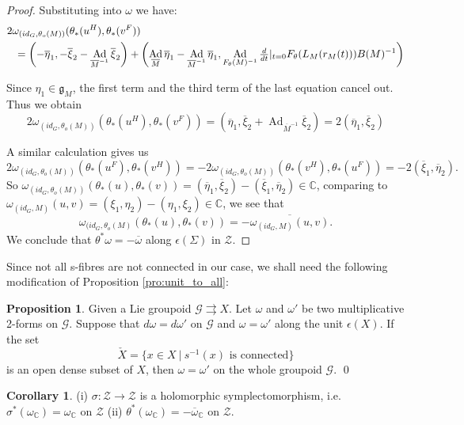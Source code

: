 \documentclass[a4paper,12pt,leqno]{amsart}
\numberwithin{equation}{section}
\theoremstyle{plain}
\theoremstyle{definition}
\DeclareMathOperator{\Ad}{Ad}
\newcommand{\cZ}{\mathcal{Z}}
\newcommand{\cG}{\mathcal{G}}
\newcommand{\bC}{\mathbb{C}}
\newcommand{\fg}{\mathfrak{g}}
\newtheorem{cor}[thm]{Corollary}
\newtheorem{pro}[thm]{Proposition}
\begin{document}
\begin{proof}
Substituting into $\omega$ we have:
\begin{eqnarray*}
\lefteqn{2\omega_{(id_G,\theta_o(M))}(\theta_*(u^H),\theta_*(v^F)) }\\
&&= \left( -\overline{\eta}_1,-\overline{\xi}_2-\Ad_{\overline{M}^{-1}}\overline{\xi}_2 \right)
 + \left( \Ad_{\overline{M}}\overline{\eta}_1-\Ad_{\overline{M}^{-1}}\overline{\eta}_1,\Ad_{F_\theta(M)^{-1}}\tfrac{d}{dt}|_{t=0}F_\theta(L_M(r_M(t)))B(M)^{-1} \right)
\end{eqnarray*}

Since $\eta_1\in\fg_M$, the first term and the third term of the last equation cancel out. Thus we obtain
$$2\omega_{(id_G,\theta_o(M))}(\theta_*(u^H),\theta_*(v^F))=(\overline{\eta}_1,\overline{\xi}_2+\Ad_{\overline{M}^{-1}}\overline{\xi}_2)=2(\overline{\eta}_1,\overline{\xi}_2)$$

A similar calculation gives us
$$2\omega_{(id_G,\theta_o(M))}(\theta_*(u^F),\theta_*(v^H))=-2\omega_{(id_G,\theta_o(M))}(\theta_*(v^H),\theta_*(u^F))=-2(\overline{\xi}_1,\overline{\eta}_2).$$
So $\omega_{(id_G,\theta_o(M))}(\theta_*(u),\theta_*(v))=(\overline{\eta}_1,\overline{\xi}_2)-(\overline{\xi}_1,\overline{\eta}_2)\in\bC$,
comparing to $\omega_{(id_G,M)}(u,v)=(\xi_1,\eta_2)-(\eta_1,\xi_2) \in\bC$, we see that $$\omega_{(id_G,\theta_o(M)}(\theta_*(u),\theta_*(v))=-\overline{\omega_{(id_G,M)}(u,v)}. $$
We conclude that $\theta^*\omega=-\overline{\omega}$ along $\epsilon(\Sigma)$ in $\cZ$.
\end{proof}

Since not all s-fibres are not connected in our case, we shall need the following modification of Proposition \ref{pro:unit_to_all}:
\begin{pro}\label{pro:dense}
Given a Lie groupoid $\cG\rightrightarrows X$.  Let $\omega$ and $\omega'$ be two multiplicative 2-forms on $\cG$. Suppose that $d\omega=d\omega'$ on $\cG$ and $\omega=\omega'$ along the unit $\epsilon(X)$. If the set
$$\check{X}=\{x\in X ~|\ s^{-1}(x) \mbox{ is connected} \} $$ is an open dense subset of $X$, then $\omega=\omega'$ on the whole groupoid $\cG$.
\qed
\end{pro}

\begin{cor}\label{cor:main}
(i) $\sigma:\cZ \to \cZ$ is a holomorphic symplectomorphism, i.e.\ $\sigma^*(\omega_\bC)=\omega_\bC$ on $\cZ$ (ii) $\theta^*(\omega_\bC)=-\overline{\omega}_\bC$ on $\cZ$.
\end{cor}
\end{document}

